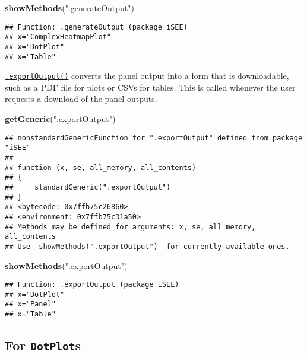 \documentclass[
]{book}
\newenvironment{Shaded}{\begin{snugshade}}{\end{snugshade}}
\newcommand{\KeywordTok}[1]{\textcolor[rgb]{0.13,0.29,0.53}{\textbf{#1}}}
\newcommand{\NormalTok}[1]{#1}
\newcommand{\StringTok}[1]{\textcolor[rgb]{0.31,0.60,0.02}{#1}}
\begin{document}
\begin{Shaded}
\begin{Highlighting}[]
\KeywordTok{showMethods}\NormalTok{(}\StringTok{".generateOutput"}\NormalTok{)}
\end{Highlighting}
\end{Shaded}

\begin{verbatim}
## Function: .generateOutput (package iSEE)
## x="ComplexHeatmapPlot"
## x="DotPlot"
## x="Table"
\end{verbatim}

\href{https://isee.github.io/iSEE/reference/output-generics.html}{\texttt{.exportOutput()}} converts the panel output into a form that is downloadable, such as a PDF file for plots or CSVs for tables.
This is called whenever the user requests a download of the panel outputs.

\begin{Shaded}
\begin{Highlighting}[]
\KeywordTok{getGeneric}\NormalTok{(}\StringTok{".exportOutput"}\NormalTok{)}
\end{Highlighting}
\end{Shaded}

\begin{verbatim}
## nonstandardGenericFunction for ".exportOutput" defined from package "iSEE"
## 
## function (x, se, all_memory, all_contents) 
## {
##     standardGeneric(".exportOutput")
## }
## <bytecode: 0x7ffb75c26860>
## <environment: 0x7ffb75c31a50>
## Methods may be defined for arguments: x, se, all_memory, all_contents
## Use  showMethods(".exportOutput")  for currently available ones.
\end{verbatim}

\begin{Shaded}
\begin{Highlighting}[]
\KeywordTok{showMethods}\NormalTok{(}\StringTok{".exportOutput"}\NormalTok{)}
\end{Highlighting}
\end{Shaded}

\begin{verbatim}
## Function: .exportOutput (package iSEE)
## x="DotPlot"
## x="Panel"
## x="Table"
\end{verbatim}

\hypertarget{for-dotplots}{%
\subsection{\texorpdfstring{For \texttt{DotPlot}s}{For DotPlots}}\label{for-dotplots}}
\end{document}

